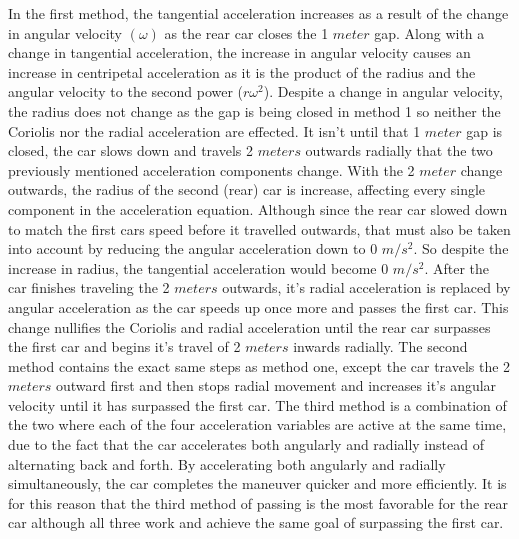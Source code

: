 \documentclass[12pt,a4paper]{article}%
\begin{document}
	In the first method, the tangential acceleration increases as a result of the change in angular velocity $(\omega)$ as the rear car closes the 1 $meter$ gap. Along with a change in tangential acceleration, the increase in angular velocity causes an increase in centripetal acceleration as it is the product of the radius and the angular velocity to the second power (${r}{\omega^2}$). Despite a change in angular velocity, the radius does not change as the gap is being closed in method 1 so neither the Coriolis nor the radial acceleration are effected. It isn't until that 1 $meter$ gap is closed, the car slows down and travels 2 $meters$ outwards radially that the two previously mentioned acceleration components change. With the 2 $meter$ change outwards, the radius of the second (rear) car is increase, affecting every single component in the acceleration equation. Although since the rear car slowed down to match the first cars speed before it travelled outwards, that must also be taken into account by reducing the angular acceleration down to 0 $m/s^2$. So despite the increase in radius, the tangential acceleration would become 0 $m/s^2$. After the car finishes traveling the 2 $meters$ outwards, it's radial acceleration is replaced by angular acceleration as the car speeds up once more and passes the first car. This change nullifies the Coriolis and radial acceleration until the rear car surpasses the first car and begins it's travel of 2 $meters$ inwards radially. The second method contains the exact same steps as method one, except the car travels the 2 $meters$ outward first and then stops radial movement and increases it's angular velocity until it has surpassed the first car. The third method is a combination of the two where each of the four acceleration variables are active at the same time, due to the fact that the car accelerates both angularly and radially instead of alternating back and forth. By accelerating both angularly and radially simultaneously, the car completes the maneuver quicker and more efficiently. It is for this reason that the third method of passing is the most favorable for the rear car although all three work and achieve the same goal of surpassing the first car.
	
	
\end{document}
